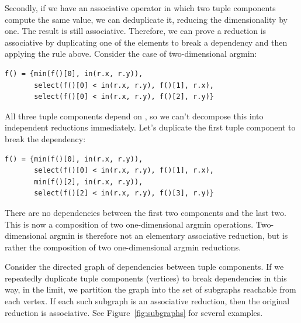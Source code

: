 

Secondly, if we have an associative operator in which two tuple components compute the same value, we can deduplicate it, reducing the dimensionality by one. The result is still associative. Therefore, we can prove a reduction is associative by duplicating one of the elements to break a dependency and then applying the rule above. Consider the case of two-dimensional argmin:

\begin{lstlisting}[caption={Two-dimensional argmin. The three tuple components are the minimum value, and its x and y coordinates.}]
f() = {min(f()[0], in(r.x, r.y)),
       select(f()[0] < in(r.x, r.y), f()[1], r.x),
       select(f()[0] < in(r.x, r.y), f()[2], r.y)}
\end{lstlisting}

All three tuple components depend on , so we can't decompose this into independent reductions immediately. Let's duplicate the first tuple component to break the dependency:

\begin{lstlisting}[caption={Two-dimensional argmin with the value redundantly computed}]
f() = {min(f()[0], in(r.x, r.y)),
       select(f()[0] < in(r.x, r.y), f()[1], r.x),
       min(f()[2], in(r.x, r.y)),
       select(f()[2] < in(r.x, r.y), f()[3], r.y)}
\end{lstlisting}

There are no dependencies between the first two components and the last two. This is now a composition of two one-dimensional argmin operations. Two-dimensional argmin is therefore not an elementary associative reduction, but is rather the composition of two one-dimensional argmin reductions.

Consider the directed graph of dependencies between tuple components. If we repeatedly duplicate tuple components (vertices) to break dependencies in this way, in the limit, we partition the graph into the set of subgraphs reachable from each vertex. If each such subgraph is an associative reduction, then the original reduction is associative. See Figure~\ref{fig:subgraphs} for several examples.


